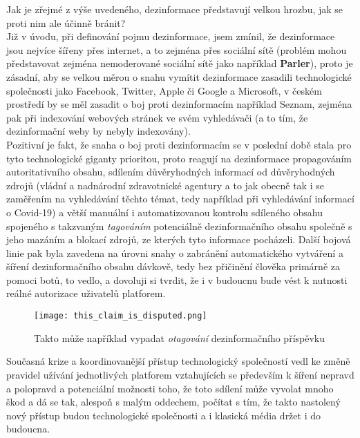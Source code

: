 Jak je zřejmé z výše uvedeného, dezinformace představují velkou hrozbu, jak se proti nim ale účinně bránit?\\

Již v úvodu, při definování pojmu dezinformace, jsem zmínil, že dezinformace jsou nejvíce šířeny přes internet, a to zejména přes sociální sítě (problém mohou představovat zejména nemoderované sociální sítě jako například \textbf{Parler}), proto je zásadní, aby se velkou měrou o snahu vymítit dezinformace zasadili technologické společnosti jako Facebook, Twitter, Apple či Google a Microsoft, v českém prostředí by se měl zasadit o boj proti dezinformacím například Seznam, zejména pak při indexování webových stránek ve svém vyhledávači (a to tím, že dezinformační weby by nebyly indexovány).\\

Pozitivní je fakt, že snaha o boj proti dezinformacím se v poslední době stala pro tyto technologické giganty prioritou, proto reagují na dezinformace propagováním autoritativního obsahu, sdílením důvěryhodných informací od důvěryhodných zdrojů (vládní a nadnárodní zdravotnické agentury a to jak obecně tak i se zaměřením na vyhledávání těchto témat, tedy například při vyhledávání informací o Covid-19) a větší manuální i automatizovanou kontrolu sdíleného obsahu spojeného s takzvaným \textit{tagováním} potenciálně dezinformačního obsahu společně s jeho mazáním a blokací zdrojů, ze kterých tyto informace pocházeli. Další bojová linie pak byla zavedena na úrovni snahy o zabránění automatického vytváření a šíření dezinformačního obsahu dávkově, tedy bez přičinění člověka primárně za pomoci botů, to vedlo, a dovoluji si tvrdit, že i v budoucnu bude vést k nutnosti reálné autorizace uživatelů platforem.\\

\begin{figure}[htbp]
  \centering
  \texttt{[image: this\_claim\_is\_disputed.png]}
  \caption{Takto může například vypadat \textit{otagování} dezinformačního příspěvku}
  \label{fig:disputed_claim}
\end{figure}

Současná krize a koordinovanější přístup technologický společností vedl ke změně pravidel užívání jednotlivých platforem vztahujících se především k šíření nepravd a polopravd a potenciální možnosti toho, že toto sdílení může vyvolat mnoho škod a dá se tak, alespoň s malým oddechem, počítat s tím, že takto nastolený nový přístup budou technologické společnosti a i klasická média držet i do budoucna.\\

